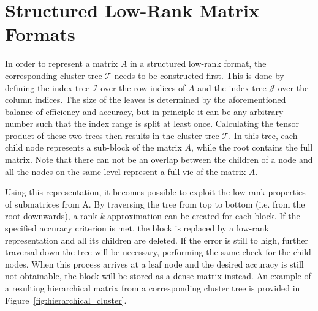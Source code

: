 \section{Structured Low-Rank Matrix Formats}
\label{sec:matrix_formats}

In order to represent a matrix $A$ in a structured low-rank format, the corresponding cluster tree $\mathcal{T}$ needs to be constructed first. This is done by defining the index tree $\mathcal{I}$ over the row indices of $A$ and the index tree $\mathcal{J}$ over the column indices. The size of the leaves is determined by the aforementioned balance of  efficiency and accuracy, but in principle it can be any arbitrary number such that the index range is split at least once. Calculating the tensor product of these two trees then results in the cluster tree $\mathcal{T}$. In this tree, each child node represents a sub-block of the matrix $A$, while the root contains the full matrix. Note that there can not be an overlap between the children of a node and all the nodes on the same level represent a full vie of the matrix $A$.

Using this representation, it becomes possible to exploit the low-rank properties of submatrices from A. By traversing the tree from top to bottom (i.e. from the root downwards), a rank $k$ approximation can be created for each block. If the specified accuracy criterion is met, the block is replaced by a low-rank representation and all its children are deleted. If the error is still to high, further traversal down the tree will be necessary, performing the same check for the child nodes. When this process arrives at a leaf node and the desired accuracy is still not obtainable, the block will be stored as a dense matrix instead. An example of a resulting hierarchical matrix from a corresponding cluster tree is provided in Figure~\hyperref[fig:hierarchical_cluster]{\ref{fig:hierarchical_cluster}}.

